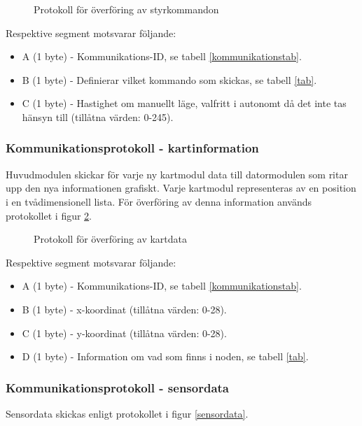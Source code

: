 \documentclass[11pt]{article}
\begin{document}
\begin{flushleft}
\begin{figure}[htbp]
\centering
\noindent\resizebox{.8\linewidth}{!}{
	}
	\caption{Protokoll för överföring av styrkommandon\label{styrdata}}	
\end{figure}

Respektive segment motsvarar följande: 
\begin{itemize}
	\item A (1 byte) - Kommunikations-ID, se tabell \ref{kommunikationstab}.
	\item B (1 byte) - Definierar vilket kommando som skickas, se tabell \ref{tab}.
	\item C (1 byte) - Hastighet om manuellt läge, valfritt i autonomt då det inte tas hänsyn till (tillåtna värden: 0-245).
\end{itemize}

\subsubsection{Kommunikationsprotokoll - kartinformation}
Huvudmodulen skickar för varje ny kartmodul data till datormodulen som ritar upp den nya informationen grafiskt. Varje kartmodul representeras av en position i en tvådimensionell lista. För överföring av denna information används protokollet i figur \ref{kartdata}.

\begin{figure}[htbp]
\centering
\noindent\resizebox{.8\linewidth}{!}{
	}
	\caption{Protokoll för överföring av kartdata \label{kartdata}}	
\end{figure}

Respektive segment motsvarar följande: 
\begin{itemize}
	\item A (1 byte) - Kommunikations-ID, se tabell \ref{kommunikationstab}.
	\item B (1 byte) - x-koordinat (tillåtna värden: 0-28).
	\item C (1 byte) - y-koordinat (tillåtna värden: 0-28).
	\item D (1 byte) - Information om vad som finns i noden, se tabell \ref{tab}.
\end{itemize}

\subsubsection{Kommunikationsprotokoll - sensordata}
Sensordata skickas enligt protokollet i figur \ref{sensordata}.


\end{flushleft}
\end{document}
